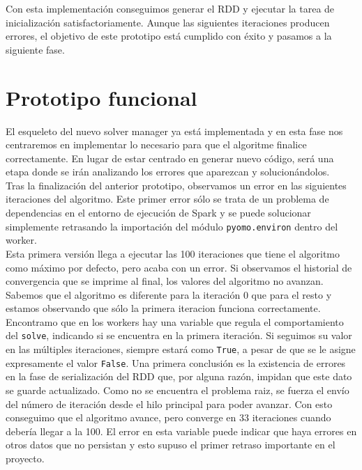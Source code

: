 Con esta implementación conseguimos generar el RDD y ejecutar la tarea de inicialización satisfactoriamente. Aunque las siguientes iteraciones producen errores, el objetivo de este prototipo está cumplido con éxito y pasamos a la siguiente fase.

\section{Prototipo funcional}


El esqueleto del nuevo solver manager ya está implementada y en esta fase nos centraremos en implementar lo necesario para que el algoritme finalice correctamente. En lugar de estar centrado en generar nuevo código, será una etapa donde se irán analizando los errores que aparezcan y solucionándolos. \\

Tras la finalización del anterior prototipo, observamos un error en las siguientes iteraciones del algoritmo. Este primer error sólo se trata de un problema de dependencias en el entorno de ejecución de Spark y se puede solucionar simplemente retrasando la importación del módulo \texttt{pyomo.environ} dentro del worker.\\

Esta primera versión llega a ejecutar las 100 iteraciones que tiene el algoritmo como máximo por defecto, pero acaba con un error. Si observamos el historial de convergencia que se imprime al final, los valores del algoritmo no avanzan. Sabemos que el algoritmo es diferente para la iteración 0 que para el resto y estamos observando que sólo la primera iteracion funciona correctamente. Encontramo que en los workers hay una variable que regula el comportamiento del \texttt{solve}, indicando si se encuentra en la primera iteración. Si seguimos su valor en las múltiples iteraciones, siempre estará como \texttt{True}, a pesar de que se le asigne expresamente el valor \texttt{False}. 
Una primera conclusión es la existencia de errores en la fase de serialización del RDD que, por alguna razón, impidan que este dato se guarde actualizado. Como no se encuentra el problema raiz, se fuerza el envío del número de iteración desde el hilo principal para poder avanzar. Con esto conseguimo que el algoritmo avance, pero converge en 33 iteraciones cuando debería llegar a la 100. El error en esta variable puede indicar que haya errores en otros datos que no persistan y esto supuso el primer retraso importante en el proyecto.\\

